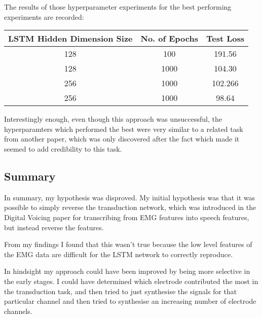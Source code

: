 The results of those hyperparameter experiments for the best
performing experiments are recorded:

{\small\begin{center}
    \begin{tabular} {  c | c | c  }
    \hline
    \textbf{LSTM Hidden Dimension Size} & \textbf{No. of Epochs} & \textbf{Test Loss} \\
    \hline
    128 & 100 & 191.56 \\
    128 & 1000 & 104.30 \\
    256 & 1000 & 102.266 \\
    256 & 1000 & 98.64 \\
    \hline
    \end{tabular}
\end{center}}

Interestingly enough, even though this approach was unsuccessful,
the hyperparamters which performed the best were very similar to
a related task from another paper, which was only discovered after the
fact which made it seemed to add credibility to this task.

\subsection{Summary}

In summary, my hypothesis was disproved.
My initial hypothesis was that it was possible to simply reverse the
transduction network, which was introduced in the Digital Voicing paper
for transcribing from EMG features into speech features, but instead
reverse the features.

From my findings I found that this wasn't true because the low level 
features of the EMG data are difficult for the LSTM network to correctly
reproduce.

In hindsight my approach could have been improved by being more selective in
the early stages. I could have determined which electrode contributed the most
in the transduction task, and then tried to just synthesise the signals for that 
particular channel and then tried to synthesise an increasing number of
electrode channels.